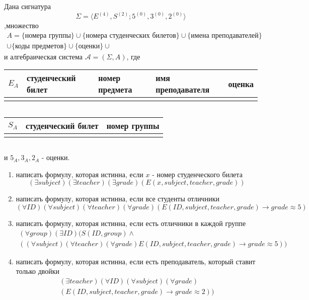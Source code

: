 \documentclass[12pt]{article}
\begin{document}
Дана сигнатура 
$$\Sigma = \langle E^{(4)},S^{(2)};5^{(0)},3^{(0)},2^{(0)}\rangle$$ 
,множество 
\begin{multline*}
A=\{\text{номера группы}\}\cup\{\text{номера студенческих билетов}\}\cup\{\text{имена преподавателей}\}\\
\cup\{\text{коды предметов}\}\cup\{\text{оценки}\}\cup
\end{multline*}
и алгебраическая система $\mathcal{A}=(\Sigma,A)$, где
\begin{table}[h]
\begin{tabular}{|c|m{3cm}|m{3cm}|m{3cm}|c|}
\hline 
$E_A$ & студенческий билет & номер предмета & имя преподавателя & оценка\\[2ex]
\hline 
 &  &  &  &  \\ 
\hline 
\end{tabular}$\quad$ 
\end{table}
\begin{table}[h]
\begin{tabular}{|c|m{3cm}|m{3cm}|}
\hline 
$S_A$ & студенческий билет & номер группы \\[2ex]
\hline 
 &  &    \\ 
\hline 
\end{tabular}$\quad$ 
\end{table}

и $5_A, 3_A, 2_A$ - оценки.
\begin{enumerate}
\item написать формулу, которая истинна, если $x$ - номер студенческого билета
$$(\exists subject)(\exists teacher)(\exists grade)(E(x,subject,teacher,grade))$$
\item написать формулу, которая истинна, если все студенты отличники
$$(\forall ID)(\forall subject)(\forall teacher)(\forall grade)(E(ID,subject,teacher,grade)\to grade\approx 5)$$
\item написать формулу, которая истинна, если есть отличники в каждой группе
\begin{multline*}
(\forall group)(\exists ID)(S(ID,group)\wedge \\((\forall subject)(\forall teacher)(\forall grade)E(ID,subject,teacher,grade)\to grade\approx 5))
\end{multline*}
\item написать формулу, которая истинна, если есть преподаватель, который ставит только двойки
\begin{multline*}
(\exists teacher)(\forall ID)(\forall subject)(\forall grade)\\(E(ID,subject,teacher,grade)\to grade\approx 2))
\end{multline*}
\end{enumerate}
\end{document}
